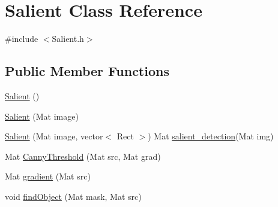 \hypertarget{classSalient}{\section{Salient Class Reference}
\label{classSalient}
}


{\ttfamily \#include $<$Salient.\-h$>$}

\subsection*{Public Member Functions}
\begin{DoxyCompactItemize}
\item 
\hyperlink{classSalient_ab833adc762328e9747ca67ec17bf61d2}{Salient} ()
\item 
\hyperlink{classSalient_a18d6eee5f1853e35bd6606f304dc2e97}{Salient} (Mat image)
\item 
\hyperlink{classSalient_a208b6601a6dbf6829cfc90999251e21f}{Salient} (Mat image, vector$<$ Rect $>$) Mat \hyperlink{SVM__detection_8cpp_a1a2bec3cfc31133af2c33d80d7a677a9}{salient\-\_\-detection}(Mat img)
\item 
Mat \hyperlink{classSalient_a0795ed8abaad113be8c42cf840b25cd2}{Canny\-Threshold} (Mat src, Mat grad)
\item 
Mat \hyperlink{classSalient_a048dcc50160b175791c55d794916c02a}{gradient} (Mat src)
\item 
void \hyperlink{classSalient_ab696dcd90383ffc4965b9be7c8d0d204}{find\-Object} (Mat mask, Mat src)
\end{DoxyCompactItemize}


